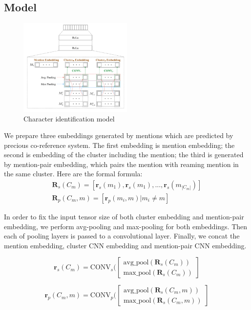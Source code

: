 \documentclass[11pt]{article}
\begin{document}
\subsection{Model}
\begin{figure}[h]                
 \includegraphics[width=0.5\textwidth]{05.jpg}
 \caption{Character identification model}             
\end{figure}

We prepare three embeddings generated by mentions which are predicted by precious co-reference system. The first embedding is mention embedding; the second is embedding of the cluster including the mention; the third is generated by mention-pair embedding, which pairs the mention with reaming mention in the same cluster. Here are the formal formula:
\begin{eqnarray}
\mathbf{R}_s(C_m) = [\mathbf{r}_s(m_1),\mathbf{r}_s(m_1),...,\mathbf{r}_s(m_{|C_m|})]\\
\mathbf{R}_p(C_m,m) = [\mathbf{r}_p(m_i,m)|m_i \neq m]
\end{eqnarray}



In order to fix the input tensor size of both cluster embedding and mention-pair embedding, we perform avg-pooling and max-pooling for both embeddings. Then each of pooling layers is passed to a convolutional layer. Finally, we concat the mention embedding, cluster CNN embedding and mention-pair CNN embedding.

\begin{equation}
\mathbf{r}_s(C_m) = \textrm{CONV}_s(\begin{bmatrix}
\text{avg\_pool}(\mathbf{R}_s(C_m))\\
\text{max\_pool}(\mathbf{R}_s(C_m))
\end{bmatrix}
\end{equation}


\begin{equation}
\mathbf{r}_p(C_m,m) = \textrm{CONV}_p(\begin{bmatrix}
\text{avg\_pool}(\mathbf{R}_s(C_m,m))\\
\text{max\_pool}(\mathbf{R}_s(C_m,m))
\end{bmatrix}
\end{equation}
\end{document}
